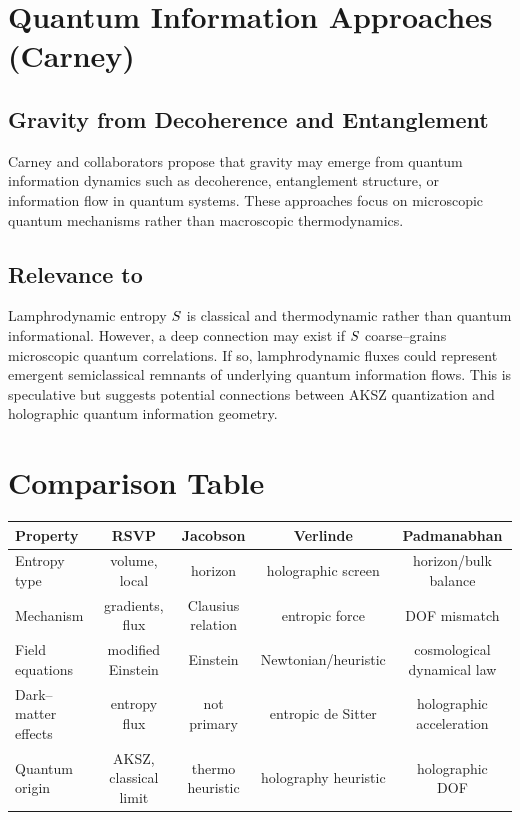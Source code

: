 \section{Quantum Information Approaches (Carney)}
\label{sec:carney}

\subsection{Gravity from Decoherence and Entanglement}

Carney and collaborators propose that gravity may emerge from quantum
information dynamics such as decoherence, entanglement structure, or
information flow in quantum systems. These approaches focus on microscopic
quantum mechanisms rather than macroscopic thermodynamics.

\subsection{Relevance to \rsvpabbr{}}

Lamphrodynamic entropy $S$ is classical and thermodynamic rather than
quantum informational. However, a deep connection may exist if $S$
coarse--grains microscopic quantum correlations. If so, lamphrodynamic fluxes
could represent emergent semiclassical remnants of underlying quantum
information flows. This is speculative but suggests potential connections
between AKSZ quantization and holographic quantum information geometry.

\section{Comparison Table}
\label{sec:comparison-table}

\begin{center}
\begin{tabular}{l|c|c|c|c}
\textbf{Property} & \textbf{RSVP} & \textbf{Jacobson} &
\textbf{Verlinde} & \textbf{Padmanabhan} \\
\hline
Entropy type &
volume, local &
horizon &
holographic screen &
horizon/bulk balance \\
\hline
Mechanism &
gradients, flux &
Clausius relation &
entropic force &
DOF mismatch \\
\hline
Field equations &
modified Einstein &
Einstein &
Newtonian/heuristic &
cosmological dynamical law \\
\hline
Dark--matter effects &
entropy flux &
not primary &
entropic de Sitter &
holographic acceleration \\
\hline
Quantum origin &
AKSZ, classical limit &
thermo heuristic &
holography heuristic &
holographic DOF
\end{tabular}
\end{center}


